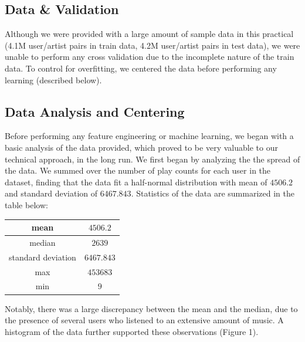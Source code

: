 \documentclass[10pt]{article}
\begin{document}
\subsection{Data \& Validation}
Although we were provided with a large amount of sample data in this practical (4.1M user/artist pairs in train data, 4.2M user/artist pairs in test data), we were unable to perform any cross validation due to the incomplete nature of the train data. To control for overfitting, we centered the data before performing any learning (described below).

\subsection{Data Analysis and Centering}
Before performing any feature engineering or machine learning, we began with a basic analysis of the data provided, which proved to be very valuable to our technical approach, in the long run. We first began by analyzing the the spread of the data. We summed over the number of play counts for each user in the dataset, finding that the data fit a half-normal distribution with mean of $4506.2$ and standard deviation of $6467.843$. Statistics of the data are summarized in the table below:

\begin{center}
 \begin{tabular}{c c} 
\hline
\hline
mean & $4506.2$ \\
\hline
median &  $2639$ \\
\hline
standard deviation & $6467.843$ \\
\hline
max & $453683$ \\
\hline
min & $9$ \\ 
\hline
\hline
\end{tabular}
\end{center}

Notably, there was a large discrepancy between the mean and the median, due to the presence of several users who listened to an extensive amount of music. A histogram of the data further supported these observations (Figure 1).
\end{document}
